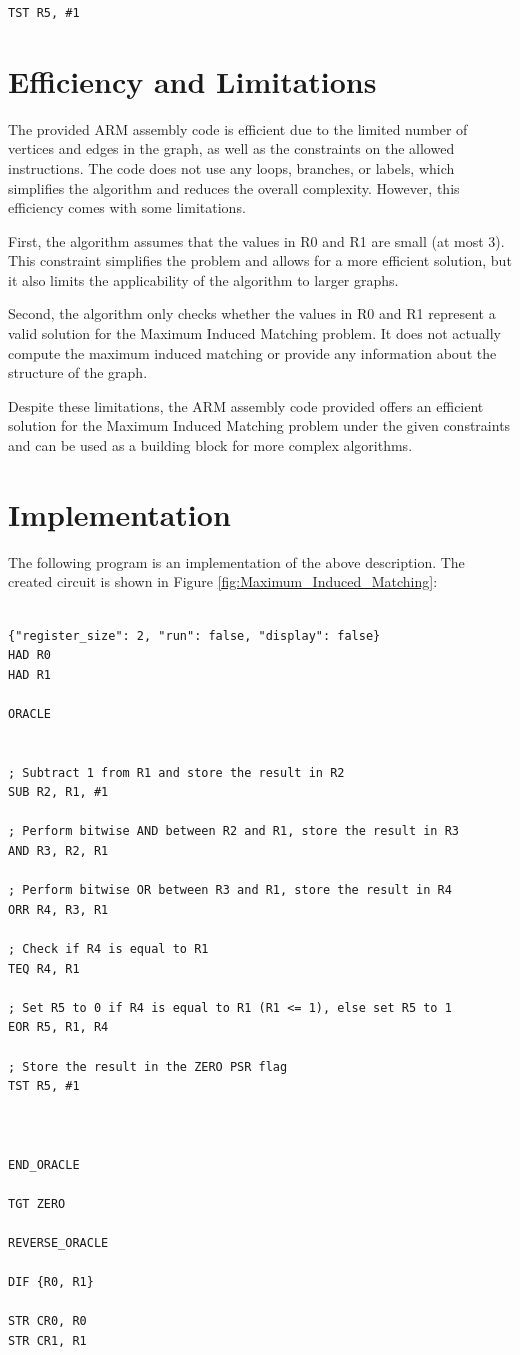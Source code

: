 \begin{verbatim}
TST R5, #1
\end{verbatim}

\section{Efficiency and Limitations}

The provided ARM assembly code is efficient due to the limited number of vertices and edges in the graph, as well as the constraints on the allowed instructions. The code does not use any loops, branches, or labels, which simplifies the algorithm and reduces the overall complexity. However, this efficiency comes with some limitations.

First, the algorithm assumes that the values in R0 and R1 are small (at most 3). This constraint simplifies the problem and allows for a more efficient solution, but it also limits the applicability of the algorithm to larger graphs.

Second, the algorithm only checks whether the values in R0 and R1 represent a valid solution for the Maximum Induced Matching problem. It does not actually compute the maximum induced matching or provide any information about the structure of the graph.

Despite these limitations, the ARM assembly code provided offers an efficient solution for the Maximum Induced Matching problem under the given constraints and can be used as a building block for more complex algorithms.



\section{Implementation}

The following program is an implementation of the above description. The created circuit is shown in Figure \ref{fig:Maximum_Induced_Matching}:

\begin{lstlisting}

{"register_size": 2, "run": false, "display": false}
HAD R0
HAD R1

ORACLE


; Subtract 1 from R1 and store the result in R2
SUB R2, R1, #1

; Perform bitwise AND between R2 and R1, store the result in R3
AND R3, R2, R1

; Perform bitwise OR between R3 and R1, store the result in R4
ORR R4, R3, R1

; Check if R4 is equal to R1
TEQ R4, R1

; Set R5 to 0 if R4 is equal to R1 (R1 <= 1), else set R5 to 1
EOR R5, R1, R4

; Store the result in the ZERO PSR flag
TST R5, #1



END_ORACLE

TGT ZERO

REVERSE_ORACLE

DIF {R0, R1}

STR CR0, R0
STR CR1, R1


\end{lstlisting}

